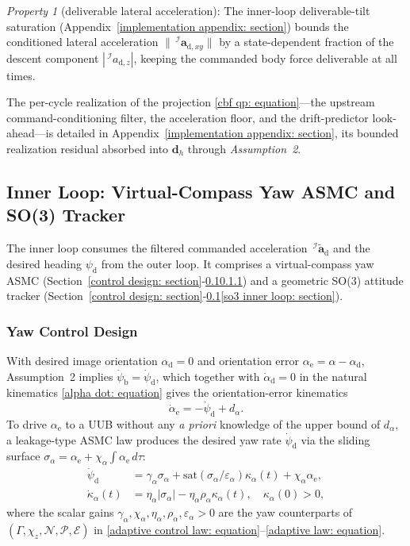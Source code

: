 \documentclass{IEEEtaes}
\begin{document}
\textit{Property 1} (deliverable lateral acceleration): The inner-loop deliverable-tilt saturation (Appendix~\ref{implementation appendix: section}) bounds the conditioned lateral acceleration $\|\,^\mathcal{I}\boldsymbol{a}_{\text{d},xy}\|$ by a state-dependent fraction of the descent component $|\,^\mathcal{I}a_{\text{d},z}|$, keeping the commanded body force deliverable at all times.

The per-cycle realization of the projection \eqref{cbf qp: equation}---the upstream command-conditioning filter, the acceleration floor, and the drift-predictor look-ahead---is detailed in Appendix~\ref{implementation appendix: section}, its bounded realization residual absorbed into $\boldsymbol{d}_h$ through \textit{Assumption~2}.

\subsection{Inner Loop: Virtual-Compass Yaw ASMC and SO(3) Tracker} \label{inner loop: section}
The inner loop consumes the filtered commanded acceleration $\,^\mathcal{I}\tilde{\boldsymbol{a}}_\text{d}$ and the desired heading $\psi_\text{d}$ from the outer loop. It comprises a virtual-compass yaw ASMC (Section~\ref{control design: section}-\ref{inner loop: section}\ref{yaw control: section}) and a geometric SO(3) attitude tracker (Section~\ref{control design: section}-\ref{inner loop: section}\ref{so3 inner loop: section}).

\subsubsection{Yaw Control Design} \label{yaw control: section}
With desired image orientation $\alpha_\text{d}=0$ and orientation error $\alpha_\text{e}=\alpha-\alpha_\text{d}$, Assumption~2 implies $\dot{\psi}_\text{b}=\dot{\psi}_\text{d}$, which together with $\dot{\alpha}_\text{d}=0$ in the natural kinematics \eqref{alpha dot: equation} gives the orientation-error kinematics
\begin{equation} \label{alpha_e_dot: equation}
    \dot{\alpha}_\text{e} = -\dot{\psi}_\text{d} + d_{\alpha}.
\end{equation}
To drive $\alpha_\text{e}$ to a UUB without any \emph{a priori} knowledge of the upper bound of $d_{\alpha}$, a leakage-type ASMC law produces the desired yaw rate $\dot{\psi}_\text{d}$ via the sliding surface $\sigma_{\alpha}=\alpha_\text{e}+\chi_{\alpha}\!\int\alpha_\text{e}\,d\tau$:
\begin{align} \label{yaw control law: equation}
    \dot{\psi}_\text{d} &= \gamma_{\alpha}\sigma_{\alpha} + \text{sat}(\sigma_{\alpha}/\varepsilon_{\alpha})\kappa_{\alpha}(t) + \chi_{\alpha} \alpha_\text{e}, \nonumber\\
    \dot{\kappa}_{\alpha}(t) &= \eta_{\alpha}|\sigma_{\alpha}| - \eta_{\alpha}\rho_{\alpha}\kappa_{\alpha}(t),\quad\kappa_{\alpha}(0)>0,
\end{align}
where the scalar gains $\gamma_{\alpha}, \chi_{\alpha}, \eta_{\alpha}, \rho_{\alpha}, \varepsilon_{\alpha} > 0$ are the yaw counterparts of $(\Gamma,\chi_z,\mathcal{N},\mathcal{P},\mathcal{E})$ in \eqref{adaptive control law: equation}--\eqref{adaptive law: equation}.
\end{document}
